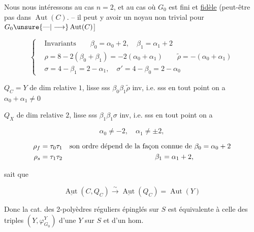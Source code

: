 Nous nous intéressons au cas $n=2$, et au cas où $G_0$ est fini et  \uline{fidèle}  (peut-être pas dans $\operatorname{Aut}(C)$. -- il peut y avoir un noyau non trivial pour $G_0\unsure{\text{---}|\longrightarrow}\operatorname{Aut}(C)$]

\[
 \left\{\begin{aligned}
 &\text{Invariants}\qquad\beta_0=\alpha_0+2,\quad\beta_1=\alpha_1+2\\
 &\rho=8-2(\beta_0+\beta_1)=-2(\alpha_0+\alpha_1)\qquad\widetilde\rho=-(\alpha_0+\alpha_1)\\
 &\sigma=4-\beta_1=2-\alpha_1,\quad\sigma'=4-\beta_0=2-\alpha_0
 \end{aligned}\right.
\]

$Q_C=Y$ de dim relative $1$, lisse sss $\beta_0\beta_1\widetilde\rho$ inv, i.e. sss en tout point on a  $\alpha_0+\alpha_1\ne0$

$Q_X$ de dim relative $2$, lisse sss $\beta_1\beta_1\sigma$ inv, i.e. sss en tout point on a

\[
 \alpha_0\ne-2,\quad\alpha_1\ne\pm2,
\]

\[
\begin{aligned}
 \rho_f&=\tau_0\tau_1\quad\text{son ordre dépend de la façon connue de }\beta_0=\alpha_0+2\\
 \rho_s&=\tau_1\tau_2\hspace{46mm}\beta_1=\alpha_1+2,
\end{aligned}
\]

  sait que


\[
 \underline{\operatorname{Aut}}(C,Q_C)\overset{\sim}{\longrightarrow}
 \underline{\operatorname{Aut}}(Q_C)=\operatorname{Aut}(Y)
\]

Donc la cat. des 2-polyèdres réguliers  épinglés sur $S$  est équivalente à celle des triples $(Y,\varphi_{G_0}^{Y})$ d'une  $Y$ sur $S$ et d'un hom.


